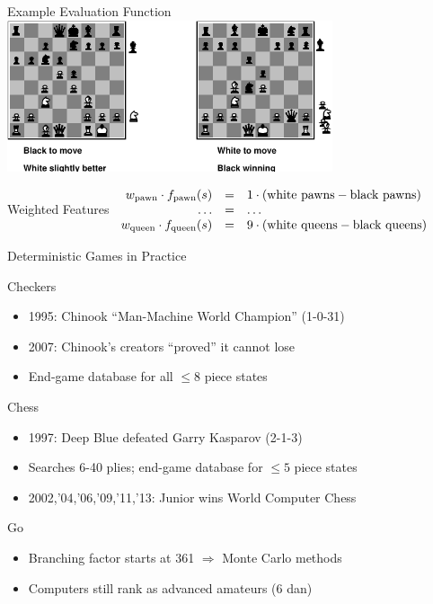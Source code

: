 \documentclass[14pt]{beamer}
\begin{document}
\begin{frame}{Example Evaluation Function}
	\centering
	\includegraphics[height=1.75in]{chess-evaluation.pdf}
	\begin{block}{Weighted Features}
		\small
		$
		\begin{array}{rcl}
			w_{\mbox{\scriptsize pawn}}  \cdot f_{\mbox{\scriptsize pawn}}(s)  & = & 1 \cdot (\mbox{white pawns} - \mbox{black pawns})   \\
			\ldots                                                             & = & \ldots \\
			w_{\mbox{\scriptsize queen}} \cdot f_{\mbox{\scriptsize queen}}(s) & = & 9 \cdot (\mbox{white queens} - \mbox{black queens})
		\end{array}
		$
	\end{block}
\end{frame}
\begin{frame}{Deterministic Games in Practice}
	\begin{block}{Checkers}
		\begin{itemize}
			\item\small 1995: Chinook ``Man-Machine World Champion'' (1-0-31)
			\item\small 2007: Chinook's creators ``proved'' it cannot lose
			\item\small End-game database for all $\leq 8$ piece states
		\end{itemize}
	\end{block}
	\begin{block}{Chess}
		\begin{itemize}
			\item\small 1997: Deep Blue defeated Garry Kasparov (2-1-3)
			\item\small Searches 6-40 plies; end-game database for $\leq 5$ piece states
			\item\small 2002,'04,'06,'09,'11,'13: Junior wins World Computer Chess
		\end{itemize}
	\end{block}
	\begin{block}{Go}
		\begin{itemize}
			\item\small Branching factor starts at 361 $\Rightarrow$ Monte Carlo methods
			\item\small Computers still rank as advanced amateurs (6 dan)
		\end{itemize}
	\end{block}
\end{frame}
\end{document}
